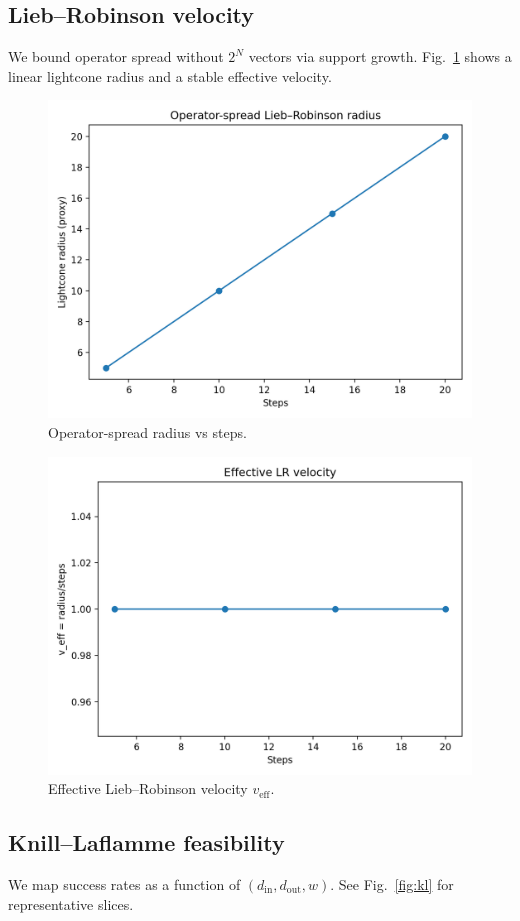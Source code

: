 \documentclass[11pt]{article}
\begin{document}
\subsection{Lieb--Robinson velocity}
We bound operator spread without $2^N$ vectors via support growth. Fig.~\ref{fig:lr} shows a linear lightcone radius and a stable effective velocity.

\begin{figure}[h]
  \centering
  \includegraphics[width=.7\textwidth]{../outputs/figs/lr_radius.png}
  \caption{Operator-spread radius vs steps.}
\end{figure}

\begin{figure}[h]
  \centering
  \includegraphics[width=.7\textwidth]{../outputs/figs/lr_velocity.png}
  \caption{Effective Lieb--Robinson velocity $v_{\mathrm{eff}}$.}
  \label{fig:lr}
\end{figure}

\subsection{Knill--Laflamme feasibility}
We map success rates as a function of $(d_{\text{in}}, d_{\text{out}}, w)$. See Fig.~\ref{fig:kl} for representative slices.
\end{document}
